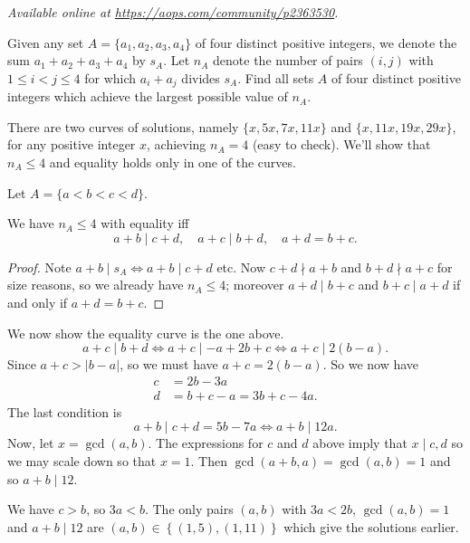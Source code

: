 \textsl{Available online at \url{https://aops.com/community/p2363530}.}
\begin{mdframed}[style=mdpurplebox,frametitle={Problem statement}]
Given any set $A = \{a_1, a_2, a_3, a_4\}$ of four distinct
positive integers, we denote the sum $a_1+a_2+a_3+a_4$ by $s_A$.
Let $n_A$ denote the number of pairs $(i,j)$ with $1 \le i < j \le 4$
for which $a_i + a_j$ divides $s_A$.
Find all sets $A$ of four distinct positive integers which achieve
the largest possible value of $n_A$.
\end{mdframed}
There are two curves of solutions,
namely $\{x,5x,7x,11x\}$ and $\{x,11x,19x,29x\}$, for any positive integer $x$,
achieving $n_A = 4$ (easy to check).
We'll show that $n_A \le 4$ and equality holds only in one of the curves.

Let $A = \{a < b < c < d\}$.
\begin{claim*}
  We have $n_A \le 4$ with equality iff
  \[ a+b \mid c+d, \quad a+c \mid b+d, \quad a+d = b+c. \]
\end{claim*}
\begin{proof}
  Note $a+b \mid s_A \iff a+b \mid c+d$ etc.
  Now $c+d \nmid a+b$ and $b+d \nmid a+c$ for size reasons, so we already have $n_A \le 4$;
  moreover $a+d \mid b+c$ and $b+c \mid a+d$ if and only if $a+d = b+c$.
\end{proof}

We now show the equality curve is the one above.
\[ a+c  \mid b+d \iff a+c \mid -a+2b+c \iff a+c \mid 2(b-a). \]
Since $a+c > |b-a|$, so we must have $a+c=2(b-a)$.
So we now have
\begin{align*}
  c &= 2b-3a \\
  d &= b+c-a = 3b+c-4a.
\end{align*}
The last condition is
\[ a+b \mid c+d = 5b-7a \iff a+b \mid 12a. \]
Now, let $x = \gcd(a,b)$.
The expressions for $c$ and $d$ above imply that
$x \mid c,d$ so we may scale down so that $x = 1$.
Then $\gcd(a+b,a) = \gcd(a,b) = 1$ and so $a+b \mid 12$.

We have $c > b$, so $3a < b$.
The only pairs $(a,b)$ with $3a < 2b$, $\gcd(a,b) = 1$ and $a+b \mid 12$
are $(a,b) \in \left\{ (1,5), (1,11) \right\}$ which give the solutions earlier.
\pagebreak